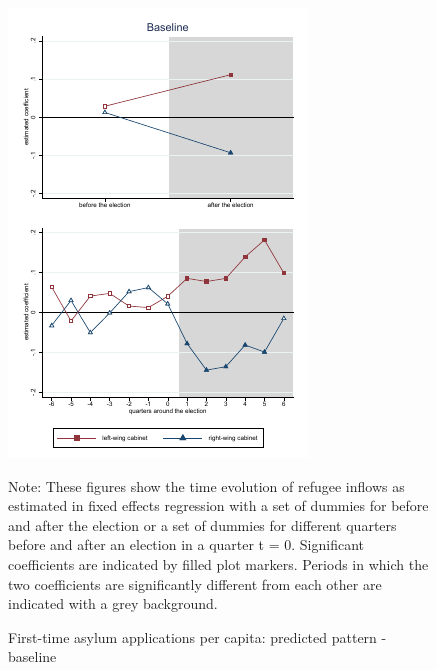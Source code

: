 \documentclass[a4paper,12pt]{article}
\begin{document}
\begin{figure}
	\caption{First-time asylum applications per capita: predicted pattern - baseline}
	\centering
	\label{main_results_app}
	\begin{minipage}{0.8\textwidth} 
		\includegraphics[width=\linewidth]{../results/applications/app_graphs_baseline.pdf}
		{\scriptsize Note: These figures show the time evolution of refugee inflows as estimated in fixed effects regression with a set of dummies for before and after the election or a set of dummies for different quarters before and after an election in a quarter t = 0. Significant coefficients are indicated by filled plot markers. Periods in which the two coefficients are significantly different from each other are indicated with a grey background.\par}
	\end{minipage}
\end{figure}
\end{document}
